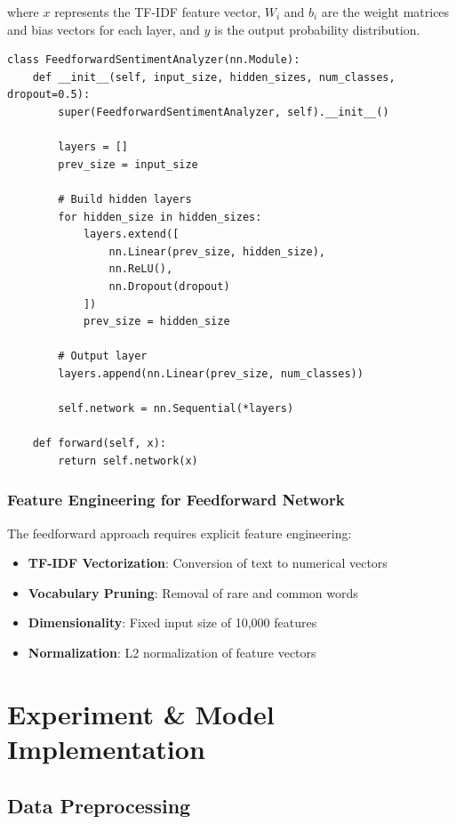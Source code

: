 \documentclass[a4paper, journal]{IEEEtran}
\begin{document}
where $x$ represents the TF-IDF feature vector, $W_i$ and $b_i$ are the weight matrices and bias vectors for each layer, and $y$ is the output probability distribution.

\begin{lstlisting}[caption=Feedforward Neural Network Architecture]
class FeedforwardSentimentAnalyzer(nn.Module):
    def __init__(self, input_size, hidden_sizes, num_classes, dropout=0.5):
        super(FeedforwardSentimentAnalyzer, self).__init__()
        
        layers = []
        prev_size = input_size
        
        # Build hidden layers
        for hidden_size in hidden_sizes:
            layers.extend([
                nn.Linear(prev_size, hidden_size),
                nn.ReLU(),
                nn.Dropout(dropout)
            ])
            prev_size = hidden_size
        
        # Output layer
        layers.append(nn.Linear(prev_size, num_classes))
        
        self.network = nn.Sequential(*layers)
    
    def forward(self, x):
        return self.network(x)
\end{lstlisting}

\subsubsection{Feature Engineering for Feedforward Network}

The feedforward approach requires explicit feature engineering:

\begin{itemize}
    \item \textbf{TF-IDF Vectorization}: Conversion of text to numerical vectors
    \item \textbf{Vocabulary Pruning}: Removal of rare and common words
    \item \textbf{Dimensionality}: Fixed input size of 10,000 features
    \item \textbf{Normalization}: L2 normalization of feature vectors
\end{itemize}

\section{Experiment \& Model Implementation}

\subsection{Data Preprocessing}
\end{document}
